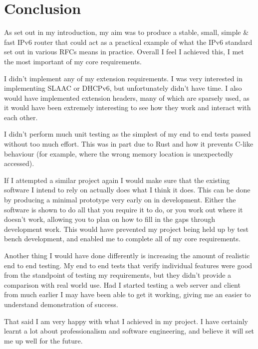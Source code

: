\documentclass[12pt,a4paper,twoside,openany]{report}
\begin{document}
\chapter{Conclusion}

As set out in my introduction, my aim was to produce a stable, small, simple \& fast IPv6 router that could act as a practical example of what the IPv6 standard set out in various RFCs means in practice.  Overall I feel I achieved this, I met the most important of my core requirements.

\bigskip

I didn't implement any of my extension requirements.  I was very interested in implementing SLAAC or DHCPv6, but unfortunately didn't have time.  I also would have implemented extension headers, many of which are sparsely used, as it would have been extremely interesting to see how they work and interact with each other.

\bigskip

I didn't perform much unit testing as the simplest of my end to end tests passed without too much effort.  This was in part due to Rust and how it prevents C-like behaviour (for example, where the wrong memory location is unexpectedly accessed).

\bigskip

If I attempted a similar project again I would make sure that the existing software I intend to rely on actually does what I think it does.  This can be done by producing a minimal prototype very early on in development.  Either the software is shown to do all that you require it to do, or you work out where it doesn't work, allowing you to plan on how to fill in the gaps through development work.  This would have prevented my project being held up by test bench development, and enabled me to complete all of my core requirements.

\bigskip

Another thing I would have done differently is increasing the amount of realistic end to end testing.  My end to end tests that verify individual features were good from the standpoint of testing my requirements, but they didn't provide a comparison with real world use.  Had I started testing a web server and client from much earlier I may have been able to get it working, giving me an easier to understand demonstration of success.

\bigskip

That said I am very happy with what I achieved in my project. I have certainly learnt a lot about professionalism and software engineering, and believe it will set me up well for the future.
\end{document}
